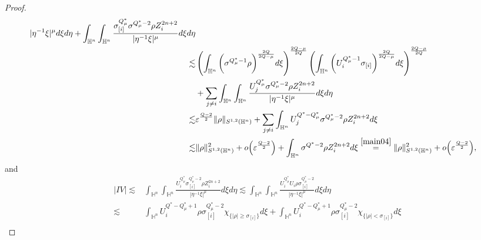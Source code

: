\documentclass[11pt]{article}
\begin{document}
\begin{proof}
\begin{align}
{%
}
{|\eta^{-1}\xi|^{\mu}} d\xi{d}\eta+\int_{\mathbb{H}^{n}}\int_{\mathbb{H}^{n}}
\frac{ \sigma_{[i]}^{Q^{\ast}_{\mu}} \sigma^{Q^{\ast}_{\mu}-2}\rho Z_i^{2n+2}
}
{|\eta^{-1}\xi|^{\mu}} d\xi{d}\eta \nonumber\\
\lesssim&\left(\int_{\mathbb{H}^{n}}\bigg(\sigma^{Q^{\ast}_{\mu}-1}\rho\bigg)^{\frac{2Q}{2Q-\mu}} d\xi\right)^{\frac{2Q-\mu}{2Q}}\left(\int_{\mathbb{H}^{n}}\bigg(U_i^{Q^{\ast}_{\mu}-1}\sigma_{[i]}\bigg)^{\frac{2Q}{2Q-\mu}} %
d\xi\right)^{\frac{2Q-\mu}{2Q}} \nonumber\\
&+\sum\limits_{j\neq i}\int_{\mathbb{H}^{n}}\int_{\mathbb{H}^{n}}
\frac{U_j^{Q^{\ast}_{\mu}}\sigma^{Q^{\ast}_{\mu}-2}\rho Z_i^{2n+2}
}
{|\eta^{-1}\xi|^{\mu}} d\xi{d}\eta
 \nonumber\\ \lesssim& \varepsilon^{\frac{Q-2}{2}}\|\rho\|_{S^{1,2}(\mathbb{H}^{n})}+\sum\limits_{j\neq i}\int_{\mathbb{H}^{n}}U_j^{Q^*-Q^{\ast}_{\mu}}\sigma^{Q^{\ast}_{\mu}-2}\rho Z_i^{2n+2} d \xi  \nonumber\\
\lesssim&
\|\rho\|_{S^{1,2}(\mathbb{H}^{n})}^2
+o\Big(\varepsilon^{\frac{Q-2}{2}}\Big)+\int_{\mathbb{H}^{n}}\sigma^{Q^{\ast}-2}\rho Z_i^{2n+2} d \xi\overset{\eqref{main04}}= \|\rho\|_{S^{1,2}(\mathbb{H}^{n})}^2
+o\Big(\varepsilon^{\frac{Q-2}{2}}\Big),
\end{align}
and
\begin{align}\label{main45}
  |IV| \lesssim&
  \int_{\mathbb{H}^{n}}\int_{\mathbb{H}^{n}}\frac{U_i^{Q^{\ast}_{\mu}}
\sigma_{[i]}^{Q^{\ast}_{\mu}-2}\rho Z_i^{2n+2}}
{|\eta^{-1}\xi|^{\mu}}d\xi{d}\eta\lesssim
  \int_{\mathbb{H}^{n}}\int_{\mathbb{H}^{n}}\frac{U_i^{Q^{\ast}_{\mu}}U_i \rho
\sigma_{[i]}^{Q^{\ast}_{\mu}-2}}
{|\eta^{-1}\xi|^{\mu}}d\xi{d}\eta
\nonumber\\%
\lesssim&\int_{\mathbb{H}^{n}}U_i^{Q^{\ast}-Q_\mu^*+1}\rho\sigma_{[i]}^{Q^{\ast}_{\mu}-2}\chi_{\{|\rho|\geq \sigma_{[i]}\}}d\xi+\int_{\mathbb{H}^{n}}U_i^{Q^{\ast}-Q_\mu^*+1}\rho\sigma_{[i]}^{Q^{\ast}_{\mu}-2}\chi_{\{|\rho|< \sigma_{[i]}\}}d\xi \nonumber\\

\end{align}
\end{proof}
\end{document}

